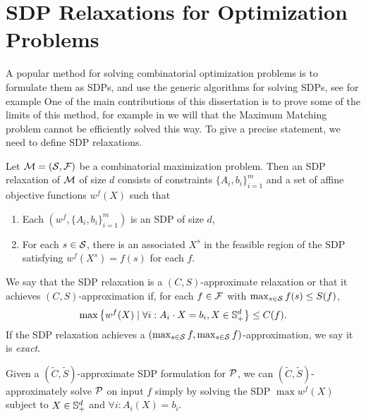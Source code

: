 \section{SDP Relaxations for Optimization Problems}
A popular method for solving combinatorial optimization problems is to formulate them as SDPs, and use the generic algorithms for solving SDPs, see for example \cite{}
One of the main contributions of this dissertation is to prove some of the limits of this method, for example in  we will
that the Maximum Matching problem cannot be efficiently solved this way. To give a precise statement, we need to define SDP relaxations.
\begin{definition}
Let $\mathcal M = (\mathcal S, \mathcal F)$ be a combinatorial maximization problem. Then an
  SDP relaxation of \(\mathcal M\)
  of size \(d\)
  consists of constraints $\{A_i, b_i\}_{i=1}^m$ and a set of affine objective functions $w^f(X)$ such that
	\begin{enumerate}
	\item Each $(w^f, \{A_i, b_i\}_{i=1}^m)$ is an SDP of size $d$,
	\item For each $s \in \mathcal S$, there is an associated $X^s$ in the feasible region of the SDP satisfying $w^f(X^s) = f(s)$ for each $f$.
	\end{enumerate}
	
	We say that the SDP relaxation is a $(C,S)$-approximate relaxation or that it achieves $(C,S)$-approximation if, for each
	$f \in \mathcal F$ with $\max_{s \in \mathcal S} f(s) \leq S(f)$, 
	\[\max \left\{ w^f(X) \mid \forall i: A_i \cdot X = b_i, X \in \mathbb{S}_+^d\right\} \leq C(f).\]
	If the SDP relaxation achieves a $(\max_{s\in \mathcal S} f, \max_{s\in \mathcal S} f)$-approximation, we say it is \emph{exact}.
\end{definition}
Given a $(\tilde{C}, \tilde{S})$-approximate SDP formulation for $\mathcal P$, we can $(\tilde{C}, \tilde{S})$-approximately solve $\mathcal P$ on input $f$ simply by solving
the SDP $\max w^f(X)$ subject to $X \in \mathbb{S}^{d}_+$ and $\forall i: A_i(X) = b_i$.

